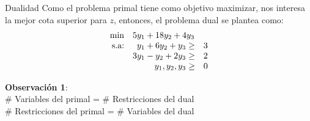 \documentclass[10pt, aspectratio=169,usenames,dvipsnames]{beamer}
\begin{document}
\begin{frame}{Dualidad}
    Como el problema primal tiene como objetivo \alert{maximizar}, nos interesa la mejor \alert{cota superior} para $z$, entonces, el problema dual se plantea como:
    \[
    \begin{array}{rrl}
        \min & \multicolumn{2}{l}{5y_1+18y_2+4y_3} \\
        \text{s.a:} & y_1+6y_2+y_3 \geq & 3 \\
        & 3y_1-y_2+2y_3 \geq & 2 \\
        & y_1,y_2,y_3\geq & 0
    \end{array}
    \]
    \pause
    \begin{tcolorbox}[colback=blue!25, colframe=blue!55!white]
    \textbf{Observación 1}:\\
    $\#$ Variables del primal = $\#$ Restricciones del dual \\
    $\#$ Restricciones del primal = $\#$ Variables del dual
    \end{tcolorbox}
\end{frame}
\end{document}
